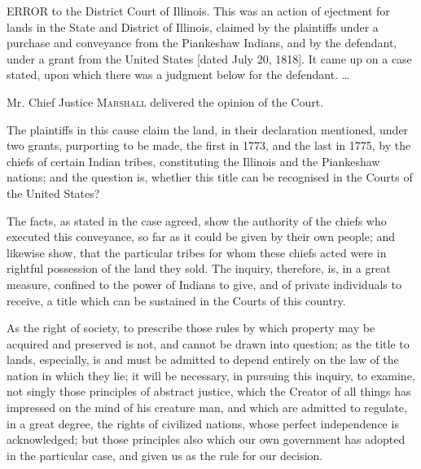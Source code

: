 


ERROR to the District Court of Illinois. This was an action of ejectment for
lands in the State and District of Illinois, claimed by the plaintiffs under a
purchase and conveyance from the Piankeshaw Indians, and by the defendant, under
a grant from the United States [dated July 20, 1818]. It came up on a case
stated, upon which there was a judgment below for the defendant. \ldots

\opinion Mr. Chief Justice \textsc{Marshall} delivered the opinion of the Court.

The plaintiffs in this cause claim the land, in their declaration mentioned,
under two grants, purporting to be made, the first in 1773, and the last in
1775, by the chiefs of certain Indian tribes, constituting the Illinois and the
Piankeshaw nations; and the question is, whether this title can be recognised in
the Courts of the United States? 

The facts, as stated in the case agreed, show the authority of the chiefs who
executed this conveyance, so far as it could be given by their own people; and
likewise show, that the particular tribes for whom these chiefs acted were in
rightful possession of the land they sold. The inquiry, therefore, is, in a
great measure, confined to the power of Indians to give, and of private
individuals to receive, a title which can be sustained in the Courts of this
country.

As the right of society, to prescribe those rules by which property may be
acquired and preserved is not, and cannot be drawn into question; as the title
to lands, especially, is and must be admitted to depend entirely on the law of
the nation in which they lie; it will be necessary, in pursuing this inquiry, to
examine, not singly those principles of abstract justice, which the Creator of
all things has impressed on the mind of his creature man, and which are admitted
to regulate, in a great degree, the rights of civilized nations, whose perfect
independence is acknowledged; but those principles also which our own government
has adopted in the particular case, and given us as the rule for our decision.


